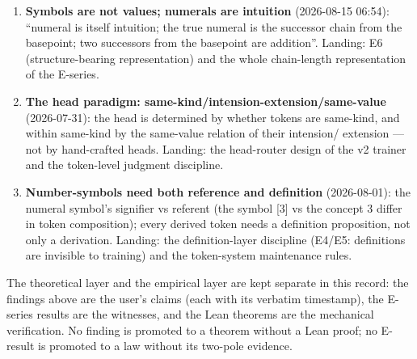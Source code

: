 \documentclass[sigplan,10pt,anonymous,review]{acmart}
\begin{document}
\begin{enumerate}
the multi-to-multi mappings between layers --- (i) \textbf{symbol-norm
theorem}: the judgment of the multi-to-multi mapping from symbols to logic
and intuition (every target must be resolvable; ambiguity converges by
context; unresolvable = non-norm); (ii) \textbf{presentation-legality
theorem}: the judgment of the mapping from logic and intuition to
presentation (every presentation target must be resolvable; numeric
coincidence without declaration is illegal); (iii) \textbf{intuition-
precision theorem}: the judgment of the mapping from intuition to logic
and presentation (the intuition-token interface must be definitionally
resolvable, must not impersonate a logic concept; precision is judged by
two-pole comparison; polarity-confusion events are the canonical failure).
A fourth theorem (symbol $\to$ presentation) completes the five-layer
coverage. Landing: \texttt{MappingJudgmentTheorems.lean} (5 theorems, 0
\texttt{sorry}, 2997 jobs) with the experiment-coverage matrix
(E6/E4/E5/E12/E13/E15/E14 + R065) --- Section~8.2.
\item \textbf{Symbols are not values; numerals are intuition} (2026-08-15
06:54): ``numeral is itself intuition; the true numeral is the successor
chain from the basepoint; two successors from the basepoint are addition''.
Landing: E6 (structure-bearing representation) and the whole chain-length
representation of the E-series.
\item \textbf{The head paradigm: same-kind/intension-extension/same-value}
(2026-07-31): the head is determined by whether tokens are same-kind,
and within same-kind by the same-value relation of their intension/
extension --- not by hand-crafted heads. Landing: the head-router design
of the v2 trainer and the token-level judgment discipline.
\item \textbf{Number-symbols need both reference and definition}
(2026-08-01): the numeral symbol's signifier vs referent (the symbol
[3] vs the concept 3 differ in token composition); every derived token
needs a definition proposition, not only a derivation. Landing: the
definition-layer discipline (E4/E5: definitions are invisible to
training) and the token-system maintenance rules.
\end{enumerate}

The theoretical layer and the empirical layer are kept separate in this
record: the findings above are the user's claims (each with its verbatim
timestamp), the E-series results are the witnesses, and the Lean theorems
are the mechanical verification. No finding is promoted to a theorem
without a Lean proof; no E-result is promoted to a law without its
two-pole evidence.
\end{document}
